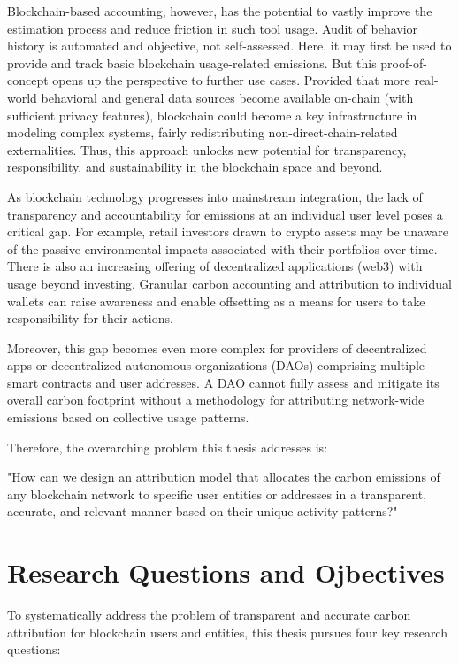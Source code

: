 \documentclass[11pt]{report}
\begin{document}

Blockchain-based accounting, however, has the potential to vastly improve the estimation process and reduce friction in such tool usage. Audit of behavior history is automated and objective, not self-assessed. Here, it may first be used to provide and track basic blockchain usage-related emissions. But this proof-of-concept opens up the perspective to further use cases. Provided that more real-world behavioral and general data sources become available on-chain (with sufficient privacy features), blockchain could become a key infrastructure in modeling complex systems, fairly redistributing non-direct-chain-related externalities. Thus, this approach unlocks new potential for transparency, responsibility, and sustainability in the blockchain space and beyond.

As blockchain technology progresses into mainstream integration, the lack of transparency and accountability for emissions at an individual user level poses a critical gap. For example, retail investors drawn to crypto assets may be unaware of the passive environmental impacts associated with their portfolios over time. There is also an increasing offering of decentralized applications (web3) with usage beyond investing. Granular carbon accounting and attribution to individual wallets can raise awareness and enable offsetting as a means for users to take responsibility for their actions.

Moreover, this gap becomes even more complex for providers of decentralized apps or decentralized autonomous organizations (DAOs) comprising multiple smart contracts and user addresses. A DAO cannot fully assess and mitigate its overall carbon footprint without a methodology for attributing network-wide emissions based on collective usage patterns.

Therefore, the overarching problem this thesis addresses is:

"How can we design an attribution model that allocates the carbon emissions of any blockchain network to specific user entities or addresses in a transparent, accurate, and relevant manner based on their unique activity patterns?"


\section{Research Questions and Ojbectives}

To systematically address the problem of transparent and accurate carbon attribution for blockchain users and entities, this thesis pursues four key research questions:
\end{document}
